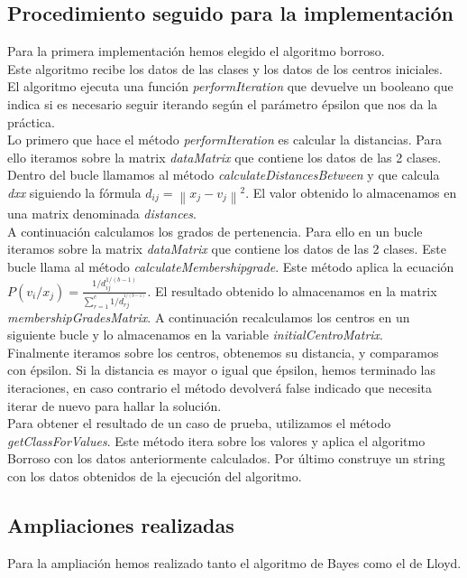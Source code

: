 \documentclass[12pt]{article}
\begin{document}
\subsection{Procedimiento seguido para la implementación}
Para la primera implementación hemos elegido el algoritmo borroso.\\
Este algoritmo recibe los datos de las clases y los datos de los centros iniciales. \\
El algoritmo ejecuta una función \textit{performIteration} que devuelve un booleano que indica si es necesario seguir iterando según el parámetro épsilon que nos da la práctica.\\
Lo primero que hace el método \textit{performIteration} es calcular la distancias. Para ello iteramos sobre la matrix \textit{dataMatrix} que contiene los datos de las 2 clases. Dentro del bucle llamamos al método \textit{calculateDistancesBetween} y que calcula \textit{dxx} siguiendo la fórmula $d_{ij}=\left \| x_{j}-v_{j} \right \|^{2}$.  El valor obtenido lo almacenamos en una matrix denominada \textit{distances}.\\
A continuación calculamos los grados de pertenencia. Para ello en un bucle iteramos sobre la matrix \textit{dataMatrix} que contiene los datos de las 2 clases. Este bucle llama al método \textit{calculateMembershipgrade}. Este método aplica la ecuación $P(v_{i}/x_{j})=\frac{1/d_{ij}^{1/(b-1)}}{\sum_{r=1}^{c}1/d_{rj}^{^{1/(b-1)}}}$. El resultado obtenido lo almacenamos en la matrix \textit{membershipGradesMatrix}. A continuación recalculamos los centros en un siguiente bucle y lo almacenamos en la variable \textit{initialCentroMatrix}.\\
Finalmente iteramos sobre los centros, obtenemos su distancia, y comparamos con épsilon. Si la distancia es mayor o igual que épsilon, hemos terminado las iteraciones, en caso contrario el método devolverá false indicado que necesita iterar de nuevo para hallar la solución.\\
Para obtener el resultado de un caso de prueba, utilizamos el método \textit{getClassForValues}. Este método itera sobre los valores y aplica el algoritmo Borroso con los datos anteriormente calculados. Por último construye un string con los datos obtenidos de la ejecución del algoritmo.

\subsection{Ampliaciones realizadas}
Para la ampliación hemos realizado tanto el algoritmo de Bayes como el de Lloyd.
\end{document}
